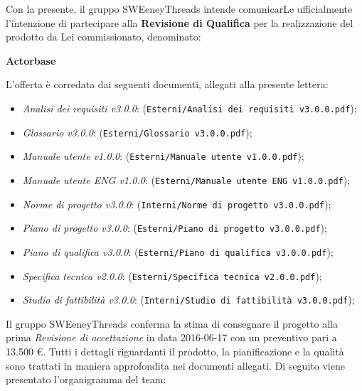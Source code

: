 \documentclass[a4paper]{article}
\begin{document}
	\vspace{5mm}Con la presente, il gruppo SWEeneyThreads intende comunicarLe ufficialmente l'intenzione di partecipare 
    alla \textbf{Revisione di Qualifica} per la realizzazione del prodotto da Lei commissionato, denominato: 
    \newline \newline
	\centerline{\textbf{Actorbase}}
	\newline \newline
	L'offerta è corredata dai seguenti documenti, allegati alla presente lettera:
	\begin{itemize}
		\item \emph{Analisi dei requisiti v3.0.0}: (\verb|Esterni/Analisi dei requisiti v3.0.0.pdf|);
		\item \emph{Glossario v3.0.0}: (\verb|Esterni/Glossario v3.0.0.pdf|);
		\item \emph{Manuale utente v1.0.0}: (\verb|Esterni/Manuale utente v1.0.0.pdf|);
		\item \emph{Manuale utente ENG v1.0.0}: (\verb|Esterni/Manuale utente ENG v1.0.0.pdf|);
		\item \emph{Norme di progetto v3.0.0}: (\verb|Interni/Norme di progetto v3.0.0.pdf|);
		\item \emph{Piano di progetto v3.0.0}: (\verb|Esterni/Piano di progetto v3.0.0.pdf|);
		\item \emph{Piano di qualifica v3.0.0}: (\verb|Esterni/Piano di qualifica v3.0.0.pdf|);
		\item \emph{Specifica tecnica v2.0.0}: (\verb|Esterni/Specifica tecnica v2.0.0.pdf|);
		\item \emph{Studio di fattibilità v3.0.0}: (\verb|Interni/Studio di fattibilità v3.0.0.pdf|);
		
	\end{itemize}
	Il gruppo SWEeneyThreads conferma la stima di consegnare il progetto alla prima \emph{Revisione di accettazione}
	in data 2016-06-17 con un preventivo pari a 13.500 \euro .
	Tutti i dettagli riguardanti il prodotto, la pianificazione e la qualità sono trattati in maniera approfondita 
	nei documenti allegati.
	\newpage
	Di seguito viene presentato l’organigramma del team:
\end{document}
